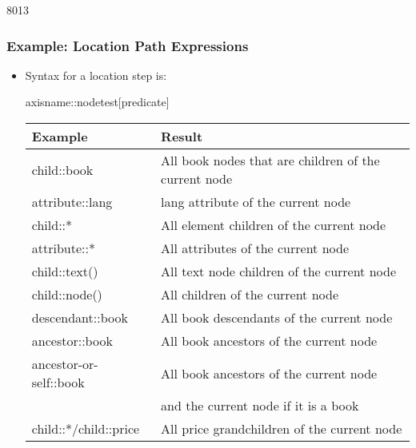 \begin{slide}[fragile]{8013}
\frametitle{Example: Location Path Expressions}
\begin{itemize}
\item Syntax for a location step is:
\vspace{4pt}
\begin{cpp}
 axisname::nodetest[predicate]
\end{cpp}

\begin{center}
\begin{tabular}{|l|l|}
\hline
\textbf{Example}        & \textbf{Result} \\ \hline
child::book             & All book nodes that are children of the current node \\ \hline
attribute::lang         & lang attribute of the current node \\ \hline
child::*                & All element children of the current node \\ \hline
attribute::*            & All attributes of the current node \\ \hline
child::text()           & All text node children of the current node \\ \hline
child::node()           & All children of the current node \\ \hline
descendant::book        & All book descendants of the current node \\ \hline
ancestor::book          & All book ancestors of the current node \\ \hline
ancestor-or-self::book  & All book ancestors of the current node \\
                        & and the current node if it is a book \\ \hline
child::*/child::price   & All price grandchildren of the current node \\ \hline
\end{tabular}
\end{center}

\end{itemize}
\end{slide}


